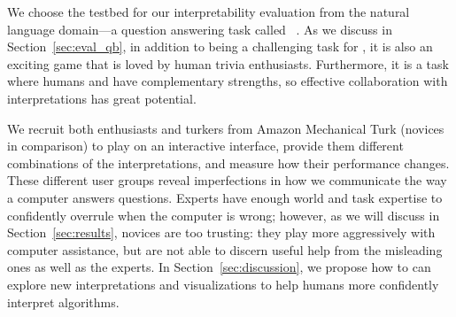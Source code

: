 We choose the testbed for our interpretability evaluation from the
natural language domain---a question answering task called
\qb{}~\cite{boydgraber2012besting}.  As we discuss in
Section~\ref{sec:eval_qb}, in addition to being a
challenging task for , it is also an exciting game that is
loved by human trivia enthusiasts. Furthermore, it is a task where
humans and  have complementary strengths, so effective
collaboration with interpretations has great potential.

We recruit both \qb{} enthusiasts and turkers from Amazon Mechanical
Turk (novices in comparison) to play \qb{} on an interactive
interface,
provide them different combinations of the interpretations, and
measure how their performance changes.  These different user groups
reveal imperfections in how we communicate the way a computer answers
questions.  Experts have enough world and task expertise to
confidently overrule when the computer is wrong; however, as we will
discuss in Section~\ref{sec:results}, novices are too trusting: they
play more aggressively with computer assistance, but are not able to
discern useful help from the misleading ones as well as the experts.
In Section~\ref{sec:discussion}, we propose how to can explore new
interpretations and visualizations to help humans more confidently
interpret  algorithms.

